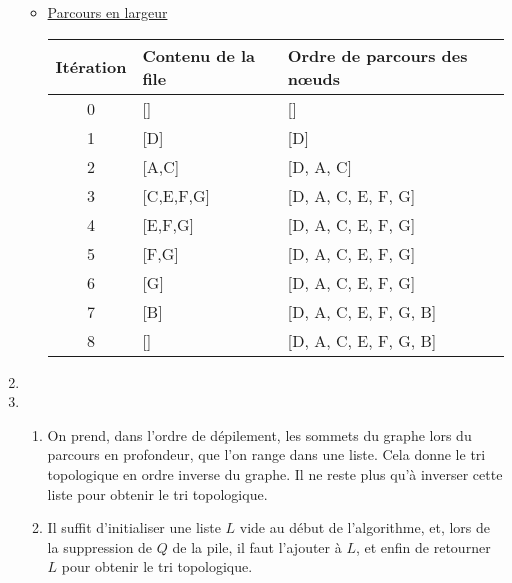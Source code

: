 \documentclass[a4paper, 12pt]{report}
\begin{document}
\begin{enumerate}
\begin{itemize}[label=$\bullet$]
\item \underline{Parcours en largeur}
\begin{center}
\begin{tabular}{|c|l|l|}
\hline
Itération & Contenu de la file & Ordre de parcours des n{\oe}uds\\
\hline
0 & [] & []\\
\hline
1 & [D] & [D]\\
\hline
2 & [A,C] & [D, A, C]\\
\hline
3 & [C,E,F,G] & [D, A, C, E, F, G]\\
\hline
4 & [E,F,G] & [D, A, C, E, F, G]\\
\hline
5 & [F,G] & [D, A, C, E, F, G]\\
\hline
6 & [G] & [D, A, C, E, F, G]\\
\hline
7 & [B] & [D, A, C, E, F, G, B]\\
\hline
8 & [] & [D, A, C, E, F, G, B]\\
\hline
\end{tabular}
\end{center}

\end{itemize}

\item 

\item
\begin{enumerate}

\item On prend, dans l'ordre de dépilement, les sommets du graphe lors du parcours en profondeur, que l'on range dans une liste. Cela donne le tri topologique en ordre inverse du graphe. Il ne reste plus qu'à inverser cette liste pour obtenir le tri topologique.\\

\item Il suffit d'initialiser une liste $L$ vide au début de l'algorithme, et, lors de la suppression de $Q$ de la pile, il faut l'ajouter à $L$, et enfin de retourner $L$ pour obtenir le tri topologique.\\

\end{enumerate}

\end{enumerate}
\end{document}
